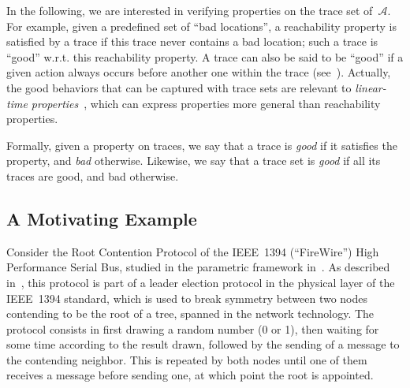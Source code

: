 \documentclass[a4paper,10pt]{article}
\newcommand{\A}{\mathcal{A}}
\begin{document}
In the following, we are interested in verifying properties on the trace set of~$\A$.
For example, given a predefined set of ``bad locations'', a reachability property is satisfied by a trace if this trace never contains a bad location; such a trace is ``good'' w.r.t. this reachability property.
A trace can also be said to be ``good'' if a given action always occurs before another one within the trace (see~\cite{af10}).
Actually, the good behaviors that can be captured with trace sets are relevant to {\em linear-time properties}~\cite{bk08}, which can express properties more general than reachability properties.

Formally, given a property on traces, we say that a trace is \emph{good} if it satisfies the property, and \emph{bad} otherwise.
Likewise, we say that a trace set is \emph{good} if all its traces are good, and bad otherwise.





\subsection{A Motivating Example} \label{ss:rcp}


Consider the Root Contention Protocol of the IEEE~1394 (``FireWire'') High Performance Serial Bus, studied in the parametric framework in~\cite{hrsv02}.
As described in~\cite{hrsv02},
this protocol is part of a leader election protocol in the physical layer of the IEEE~1394 standard, which is used to break symmetry between two nodes contending to be the root of a tree, spanned in the network technology.
The protocol consists in first drawing a random number (0 or 1), then waiting for some time according to the result drawn, followed by the sending of a message to the contending neighbor.
This is repeated by both nodes until one of them receives a message before sending one, at which point the root is appointed.
\end{document}
